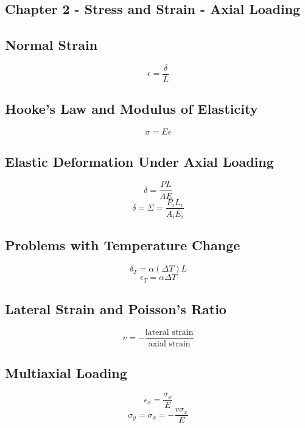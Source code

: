 \documentclass[10pt,landscape]{article}
\begin{document}
\begin{multicols}{3}
\section{Chapter 2 - Stress and Strain - Axial Loading}
\subsection{Normal Strain}
\begin{equation}
    \epsilon=\frac{\delta}{L}
\end{equation}
\subsection{Hooke's Law and Modulus of Elasticity}
\begin{equation}
    \sigma=E\epsilon
\end{equation}
\subsection{Elastic Deformation Under Axial Loading}
\begin{equation}
    \delta=\frac{PL}{AE}
\end{equation}
\begin{equation}
    \delta=\Sigma=\frac{P_iL_i}{A_iE_i}
\end{equation}
\subsection{Problems with Temperature Change}
\begin{equation}
    \delta_T=\alpha(\Delta T)L     
\end{equation}
\begin{equation}
    \epsilon_T=\alpha\Delta T
\end{equation}
\subsection{Lateral Strain and Poisson's Ratio}
\begin{equation}
    v=-\frac{\text{lateral strain}}{\text{axial strain}}
\end{equation}
\subsection{Multiaxial Loading}
\begin{equation}
    \epsilon_x=\frac{\sigma_x}{E}
\end{equation}
\begin{equation}
    \sigma_y=\sigma_x=-\frac{v\sigma_x}{E}
\end{equation}

\end{multicols}
\end{document}
